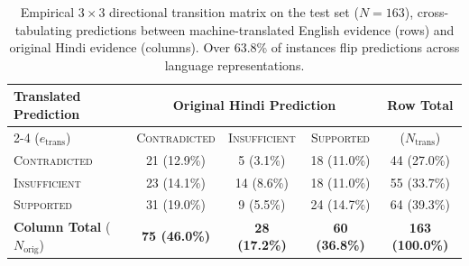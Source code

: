 \begin{table}[t]
\centering
\small
\caption{Empirical $3 \times 3$ directional transition matrix on the test set ($N=163$), cross-tabulating predictions between machine-translated English evidence (rows) and original Hindi evidence (columns). Over 63.8\% of instances flip predictions across language representations.}
\label{tab:transition-matrix}
\begin{tabular}{lcccc}
\toprule
\textbf{Translated Prediction} & \multicolumn{3}{c}{\textbf{Original Hindi Prediction}} & \textbf{Row Total} \\
\cmidrule(lr){2-4}
($e_{\text{trans}}$) & \textsc{Contradicted} & \textsc{Insufficient} & \textsc{Supported} & ($N_{\text{trans}}$) \\
\midrule
\textsc{Contradicted} & 21 (12.9\%) & 5 (3.1\%) & 18 (11.0\%) & 44 (27.0\%) \\
\textsc{Insufficient} & 23 (14.1\%) & 14 (8.6\%) & 18 (11.0\%) & 55 (33.7\%) \\
\textsc{Supported}    & 31 (19.0\%) & 9 (5.5\%) & 24 (14.7\%) & 64 (39.3\%) \\
\midrule
\textbf{Column Total} ($N_{\text{orig}}$) & \textbf{75 (46.0\%)} & \textbf{28 (17.2\%)} & \textbf{60 (36.8\%)} & \textbf{163 (100.0\%)} \\
\bottomrule
\end{tabular}
\end{table}
